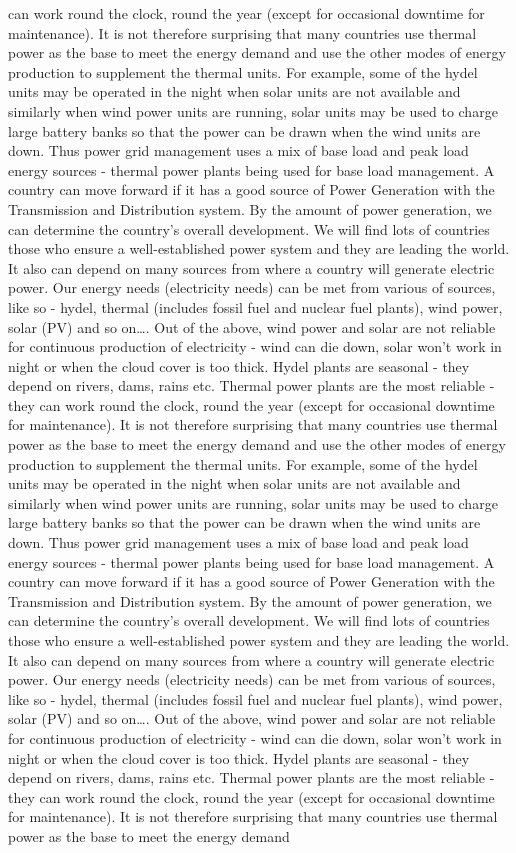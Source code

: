 \documentclass[10pt, a4paper]{article}
\begin{document}
can work round the clock, round the year (except for occasional downtime for maintenance). It is not therefore surprising that many countries use thermal power as the base to meet the energy demand and use the other modes of energy production to supplement the thermal units. For example, some of the hydel units may be operated in the night when solar units are not available and similarly when wind power units are running, solar units may be used to charge large battery banks so that the power can be drawn when the wind units are down. Thus power grid management uses a mix of base load and peak load energy sources - thermal power plants being used for base load management. A country can move forward if it has a good source of Power Generation with the Transmission and Distribution system. By the amount of power generation, we can determine the country’s overall development. We will find lots of countries those who ensure a well-established power system and they are leading the world. It also can depend on many sources from where a country will generate electric power. Our energy needs (electricity needs) can be met from various of sources, like so - hydel, thermal (includes fossil fuel and nuclear fuel plants), wind power, solar (PV) and so on\dots. Out of the above, wind power and solar are not reliable for continuous production of electricity - wind can die down, solar won’t work in night or when the cloud cover is too thick. Hydel plants are seasonal - they depend on rivers, dams, rains etc. Thermal power plants are the most reliable - they can work round the clock, round the year (except for occasional downtime for maintenance). It is not therefore surprising that many countries use thermal power as the base to meet the energy demand and use the other modes of energy production to supplement the thermal units. For example, some of the hydel units may be operated in the night when solar units are not available and similarly when wind power units are running, solar units may be used to charge large battery banks so that the power can be drawn when the wind units are down. Thus power grid management uses a mix of base load and peak load energy sources - thermal power plants being used for base load management. A country can move forward if it has a good source of Power Generation with the Transmission and Distribution system. By the amount of power generation, we can determine the country’s overall development. We will find lots of countries those who ensure a well-established power system and they are leading the world. It also can depend on many sources from where a country will generate electric power. Our energy needs (electricity needs) can be met from various of sources, like so - hydel, thermal (includes fossil fuel and nuclear fuel plants), wind power, solar (PV) and so on\dots. Out of the above, wind power and solar are not reliable for continuous production of electricity - wind can die down, solar won’t work in night or when the cloud cover is too thick. Hydel plants are seasonal - they depend on rivers, dams, rains etc. Thermal power plants are the most reliable - they can work round the clock, round the year (except for occasional downtime for maintenance). It is not therefore surprising that many countries use thermal power as the base to meet the energy demand 
\end{document}
